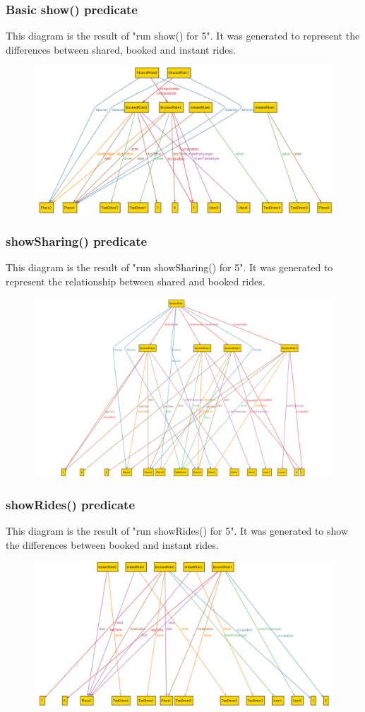 \subsubsection{Basic show() predicate}
This diagram is the result of "run show() for 5". It was generated to represent the differences between shared, booked and instant rides.
\begin{figure}[h!]
		\includegraphics[width=\textwidth]{"myTaxiServiceImg/Alloy/alloyshow"}
\end{figure}
\newpage

\subsubsection{showSharing() predicate}
This diagram is the result of "run showSharing() for 5". It was generated to represent the relationship between shared and booked rides.
\begin{figure}[h!]
		\includegraphics[width=\textwidth]{"myTaxiServiceImg/Alloy/alloysharing"}
\end{figure}
\newpage

\subsubsection{showRides() predicate}
This diagram is the result of "run showRides() for 5". It was generated to show the differences between booked and instant rides.
\begin{figure}[h!]
		\includegraphics[width=\textwidth]{"myTaxiServiceImg/Alloy/alloyrides"}
\end{figure}
\newpage
